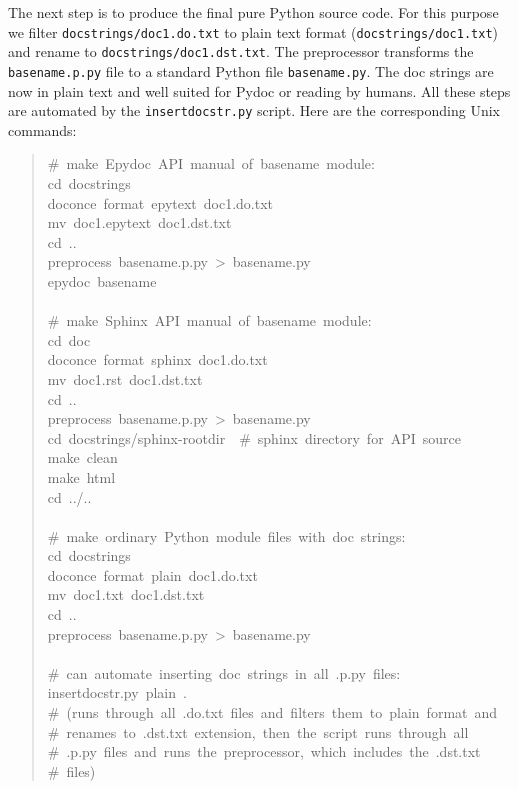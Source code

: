 \documentclass[a4paper,english]{article}
\begin{document}
The next step is to produce the final pure Python source code. For
this purpose we filter \texttt{docstrings/doc1.do.txt} to plain text format
(\texttt{docstrings/doc1.txt}) and rename to \texttt{docstrings/doc1.dst.txt}. The
preprocessor transforms the \texttt{basename.p.py} file to a standard Python
file \texttt{basename.py}. The doc strings are now in plain text and well
suited for Pydoc or reading by humans. All these steps are automated
by the \texttt{insertdocstr.py} script.  Here are the corresponding Unix
commands:
%
\begin{quote}{\ttfamily \raggedright \noindent
\#~make~Epydoc~API~manual~of~basename~module:\\
cd~docstrings\\
doconce~format~epytext~doc1.do.txt\\
mv~doc1.epytext~doc1.dst.txt\\
cd~..\\
preprocess~basename.p.py~>~basename.py\\
epydoc~basename\\
~\\
\#~make~Sphinx~API~manual~of~basename~module:\\
cd~doc\\
doconce~format~sphinx~doc1.do.txt\\
mv~doc1.rst~doc1.dst.txt\\
cd~..\\
preprocess~basename.p.py~>~basename.py\\
cd~docstrings/sphinx-rootdir~~\#~sphinx~directory~for~API~source\\
make~clean\\
make~html\\
cd~../..\\
~\\
\#~make~ordinary~Python~module~files~with~doc~strings:\\
cd~docstrings\\
doconce~format~plain~doc1.do.txt\\
mv~doc1.txt~doc1.dst.txt\\
cd~..\\
preprocess~basename.p.py~>~basename.py\\
~\\
\#~can~automate~inserting~doc~strings~in~all~.p.py~files:\\
insertdocstr.py~plain~.\\
\#~(runs~through~all~.do.txt~files~and~filters~them~to~plain~format~and\\
\#~renames~to~.dst.txt~extension,~then~the~script~runs~through~all\\
\#~.p.py~files~and~runs~the~preprocessor,~which~includes~the~.dst.txt\\
\#~files)
}
\end{quote}
\end{document}
